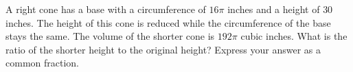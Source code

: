 A right cone has a base with a circumference of $16\pi$ inches and a height of $30$ inches. The height of this cone is reduced while the circumference of the base stays the same. The volume of the shorter cone is $192\pi$ cubic inches. What is the ratio of the shorter height to the original height? Express your answer as a common fraction.
